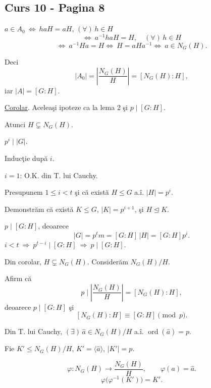 
\subsection*{Curs 10 - Pagina 8}

\noindent $a\in A_0\ \Longleftrightarrow\ haH=aH$, $(\forall)\,h\in H$
\[
\Longleftrightarrow\ a^{-1}haH=H,\quad(\forall)\,h\in H
\]
\[
\Longleftrightarrow\ a^{-1}Ha=H
\Longleftrightarrow\ H=aHa^{-1}
\Longleftrightarrow\ a\in N_G(H).
\]

\noindent Deci
\[
|A_0|=\left|\frac{N_G(H)}{H}\right|=[N_G(H):H],
\]
\noindent iar $|A|=[G:H]$.

\bigskip
\noindent\underline{Corolar}. Aceleaşi ipoteze ca la lema 2 şi
$p\mid[G:H]$.

\noindent Atunci $H\subsetneq N_G(H)$.

\bigskip
\noindent{}\quad $p^i\mid |G|$.

\medskip
\noindent Inducţie după $i$.

\noindent $i=1$: O.K. din T. lui Cauchy.

\medskip
\noindent Presupunem $1\leq i<t$ şi că există $H\leq G$ a.î.
$|H|=p^i$.

\noindent Demonstrăm că există $K\leq G$, $|K|=p^{i+1}$,
şi $H\trianglelefteq K$.

\medskip
\noindent $p\mid[G:H]$, deoarece
\[
|G|=p^t m=[G:H]\,|H|=[G:H]p^i.
\]
\noindent $i<t\ \Longrightarrow\ p^{t-i}\mid[G:H]
\ \Longrightarrow\ p\mid[G:H]$.

\medskip
\noindent Din corolar, $H\subsetneq N_G(H)$.
Considerăm $N_G(H)/H$.

\medskip
\noindent Afirm că
\[
p\mid\left|\frac{N_G(H)}{H}\right|=[N_G(H):H],
\]
\noindent deoarece $p\mid[G:H]$ şi
\[
[N_G(H):H]\equiv[G:H]\pmod p.
\]

\noindent Din T. lui Cauchy, $(\exists)\,\hat a\in N_G(H)/H$
a.î. $\operatorname{ord}(\hat a)=p$.

\medskip
\noindent Fie $K'\leq N_G(H)/H$, $K'=\langle\hat a\rangle$,
$|K'|=p$.

\[
\varphi:N_G(H)\longrightarrow\frac{N_G(H)}{H},
\qquad \varphi(a)=\hat a.
\]
\[
\varphi\bigl(\varphi^{-1}(K')\bigr)=K'.
\]
